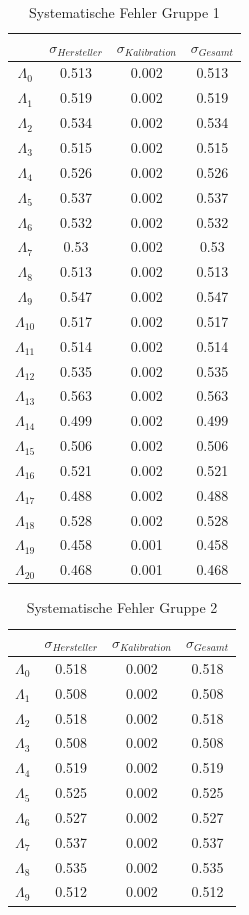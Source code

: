 \documentclass[12pt,a4paper]{article}
\begin{document}
\newpage
\begin{multicols}{2}
\begin{table}[H]\centering
\caption{Systematische Fehler Gruppe 1}
\begin{tabular}{c|c|c|c}
 &$\sigma_{Hersteller}$&$\sigma_{Kalibration}$&$\sigma_{Gesamt}$\\
\hline
$\Lambda_0$&0.513&0.002&0.513\\
$\Lambda_1$&0.519&0.002&0.519\\
$\Lambda_2$&0.534&0.002&0.534\\
$\Lambda_3$&0.515&0.002&0.515\\
$\Lambda_4$&0.526&0.002&0.526\\
$\Lambda_5$&0.537&0.002&0.537\\
$\Lambda_6$&0.532&0.002&0.532\\
$\Lambda_7$&0.53&0.002&0.53\\
$\Lambda_8$&0.513&0.002&0.513\\
$\Lambda_9$&0.547&0.002&0.547\\
$\Lambda_{10}$&0.517&0.002&0.517\\
$\Lambda_{11}$&0.514&0.002&0.514\\
$\Lambda_{12}$&0.535&0.002&0.535\\
$\Lambda_{13}$&0.563&0.002&0.563\\
$\Lambda_{14}$&0.499&0.002&0.499\\
$\Lambda_{15}$&0.506&0.002&0.506\\
$\Lambda_{16}$&0.521&0.002&0.521\\
$\Lambda_{17}$&0.488&0.002&0.488\\
$\Lambda_{18}$&0.528&0.002&0.528\\
$\Lambda_{19}$&0.458&0.001&0.458\\
$\Lambda_{20}$&0.468&0.001&0.468\\
\end{tabular}
\end{table}
\begin{table}[H]\centering
\caption{Systematische Fehler Gruppe 2}
\begin{tabular}{c|c|c|c}
 &$\sigma_{Hersteller}$&$\sigma_{Kalibration}$&$\sigma_{Gesamt}$\\
\hline
$\Lambda_0$&0.518&0.002&0.518\\
$\Lambda_1$&0.508&0.002&0.508\\
$\Lambda_2$&0.518&0.002&0.518\\
$\Lambda_3$&0.508&0.002&0.508\\
$\Lambda_4$&0.519&0.002&0.519\\
$\Lambda_5$&0.525&0.002&0.525\\
$\Lambda_6$&0.527&0.002&0.527\\
$\Lambda_7$&0.537&0.002&0.537\\
$\Lambda_8$&0.535&0.002&0.535\\
$\Lambda_9$&0.512&0.002&0.512\\
\end{tabular}
\end{table}
\end{multicols}
\end{document}
